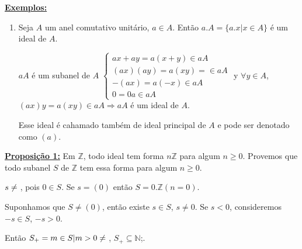 \documentclass[12pt]{book}
\newcommand{\mytitle}[1]{\textbf{\underline{#1}}}
\begin{document}
  \mytitle{Exemplos:}
  \begin{enumerate}
  \item Seja $A$ um anel comutativo unitário, $a \in A$. Então $a.A=\{a.x|x \in A\}$ é um ideal de $A$.

    $aA$ é um subanel de $A$
    $\begin{cases}
      ax+ay=a(x+y) \in aA\\
      (ax)(ay)=a(xy)= \in aA\\
      -(ax)=a(-x) \in aA\\
      0=0a \in aA
    \end{cases}$
    y
    $\forall y \in A$, $(ax)y=a(xy)\in aA \Rightarrow aA$ é um ideal de $A$.

    Esse ideal é cahamado também de ideal principal de $A$ e pode ser denotado como $(a)$.
  \end{enumerate}

  \mytitle{Proposição 1:} Em $\mathbb{Z}$, todo ideal tem forma $n\mathbb{Z}$ para algum $n\geq 0$. Provemos que todo subanel $S$ de $\mathbb{Z}$ tem essa forma para algum $n\geq 0$.

  $s\neq \null$, pois $0 \in S$. Se $s=(0)$ então $S=0.\mathbb{Z} (n=0)$.

  Suponhamos que $S\neq (0)$, então existe $s\in S$, $s\neq 0$. Se $s<0$, consideremos $-s\in S$, $-s>0$.

  Então $S_+={m\in S|m>0}\neq \null$, $S_+\subseteq \mathbb{N}$;.


  
\end{document}
